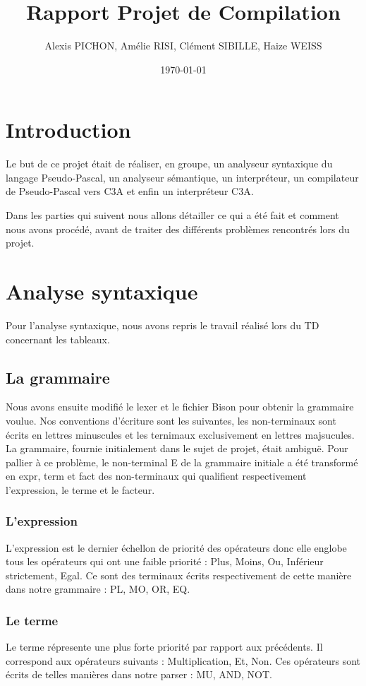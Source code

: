 \documentclass[11pt,a4paper]{article}
\title{Rapport Projet de Compilation}
\author{Alexis PICHON, Amélie RISI, Clément SIBILLE, Haize WEISS}
\date{\today}
\begin{document}
\maketitle
\tableofcontents
\pagebreak

\setlength{\parskip}{1em}
\setlength{\intextsep}{2em}


\section{Introduction}
Le but de ce projet était de réaliser, en groupe, un analyseur syntaxique du langage Pseudo-Pascal, un analyseur sémantique, un interpréteur, un compilateur de Pseudo-Pascal vers C3A et enfin un interpréteur C3A.
\par
Dans les parties qui suivent nous allons détailler ce qui a été fait et comment nous avons procédé, avant de traiter des différents problèmes rencontrés lors du projet.




\section{Analyse syntaxique}
Pour l'analyse syntaxique, nous avons repris le travail réalisé lors du TD concernant les tableaux. 

\subsection{La grammaire}
Nous avons ensuite modifié le lexer et le fichier Bison pour obtenir la grammaire voulue. Nos conventions d'écriture sont les suivantes, les non-terminaux sont écrits en lettres minuscules et les ternimaux exclusivement en lettres majsucules. 
La grammaire, fournie initialement dans le sujet de projet, était ambiguë. Pour pallier à ce problème, le non-terminal E de la grammaire initiale a été transformé en expr, term et fact des non-terminaux qui qualifient respectivement l'expression, le terme et le facteur. 
\subsubsection{L'expression}
L'expression est le dernier échellon de priorité des opérateurs donc elle englobe tous les opérateurs qui ont une faible priorité : Plus, Moins, Ou, Inférieur strictement, Egal. 
Ce sont des terminaux écrits respectivement de cette manière dans notre grammaire : PL, MO, OR, EQ.
\subsubsection{Le terme}
Le terme répresente une plus forte priorité par rapport aux précédents. Il correspond aux opérateurs suivants : Multiplication, Et, Non.
Ces opérateurs sont écrits de telles manières dans notre parser : MU, AND, NOT.  
\end{document}
